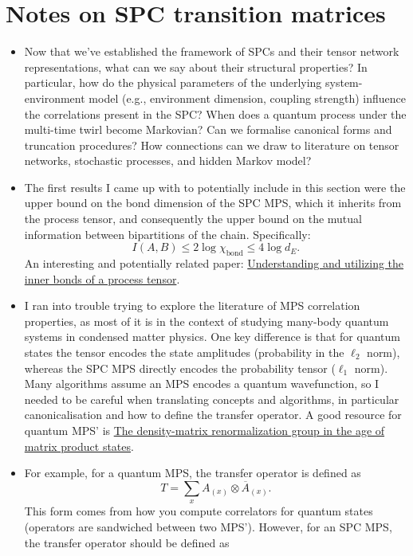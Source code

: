 \section*{Notes on SPC transition matrices}
\begin{itemize}
    \item Now that we've established the framework of SPCs and their tensor network representations, what can we say about their structural properties? In particular, how do the physical parameters of the underlying system-environment model (e.g., environment dimension, coupling strength) influence the correlations present in the SPC? When does a quantum process under the multi-time twirl become Markovian? Can we formalise canonical forms and truncation procedures? How connections can we draw to literature on tensor networks, stochastic processes, and hidden Markov model?
    \item The first results I came up with to potentially include in this section were the upper bound on the bond dimension of the SPC MPS, which it inherits from the process tensor, and consequently the upper bound on the mutual information between bipartitions of the chain. Specifically:
    \[
    I(A,B) \leq 2\log \chi_{\mathrm{bond}} \leq 4\log d_E.
    \]
    An interesting and potentially related paper: \href{https://arxiv.org/abs/2404.01287}{Understanding and utilizing the inner bonds of a process tensor}.
    \item I ran into trouble trying to explore the literature of MPS correlation properties, as most of it is in the context of studying many-body quantum systems in condensed matter physics. One key difference is that for quantum states the tensor encodes the state amplitudes (probability in the \(\ell_2\) norm), whereas the SPC MPS directly encodes the probability tensor (\(\ell_1\) norm). Many algorithms assume an MPS encodes a quantum wavefunction, so I needed to be careful when translating concepts and algorithms, in particular canonicalisation and how to define the transfer operator. A good resource for quantum MPS' is \href{https://arxiv.org/abs/1008.3477}{The density-matrix renormalization group in the age of matrix product states}.
    \item For example, for a quantum MPS, the transfer operator is defined as 
    \[T = \sum_x A_{(x)} \otimes \overline{A}_{(x)}.\]
    This form comes from how you compute correlators for quantum states (operators are sandwiched between two MPS'). However, for an SPC MPS, the transfer operator should be defined as 

\end{itemize}
